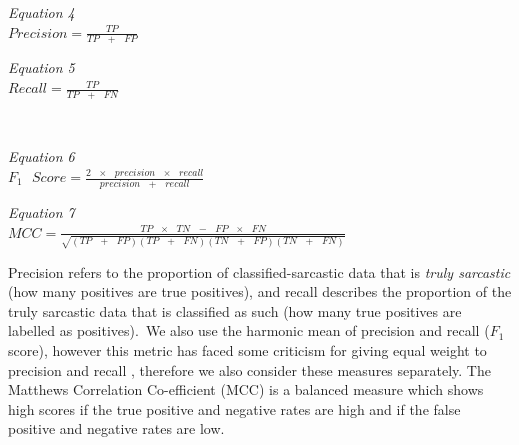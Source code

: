 \documentclass[12pt,a4paper]{article}
\begin{document}
\hspace{-30pt}\begin{center}
	\begin{minipage}{0.47\textwidth}
		\textit{Equation 4}\hfill\\
		$Precision =\frac{TP}{TP\text{ } + \text{ }FP}$\\
	\end{minipage}
	\hspace{-30pt}\begin{minipage}{0.47\textwidth}
		\textit{Equation 5}\hfill\\$Recall =\frac{TP}{TP\text{ } + \text{ }FN}$\\
	\end{minipage}\\
\end{center}
\vspace{-20pt}
\begin{center}
	\begin{minipage}{0.47\textwidth}
		\textit{Equation 6}\hfill\\$F_1\text{ } Score =\frac{2 \text{ }\times\text{ } precision\text{ } \times \text{ }recall}{precision\text{ } + \text{ }recall}$
	\end{minipage}
	\hspace{-30pt}\begin{minipage}{0.47\textwidth}
		\textit{Equation 7}\hfill\\$MCC =\frac{TP \text{ } \times \text{ } TN \text{ } - \text{ } FP\text{ } \times \text{ } FN}{\sqrt{(TP \text{ } + \text{ } FP)(TP \text{ } + \text{ } FN)(TN \text{ } + \text{ } FP)(TN \text{ } + \text{ } FN)}}$
	\end{minipage}
\end{center}

\noindent Precision refers to the proportion of classified-sarcastic data that is \textit{truly sarcastic} (how many positives are true positives), and recall describes the proportion of the truly sarcastic data that is classified as such (how many true positives are labelled as positives).\ We also use the harmonic mean of precision and recall ($F_{1}$ score), however this metric has faced some criticism for giving equal weight to precision and recall \cite{hand2018note}, therefore we also consider these measures separately. The Matthews Correlation Co-efficient (MCC) is a balanced measure which shows high scores if the true positive and negative rates are high and if the false positive and negative rates are low.

\end{document}
